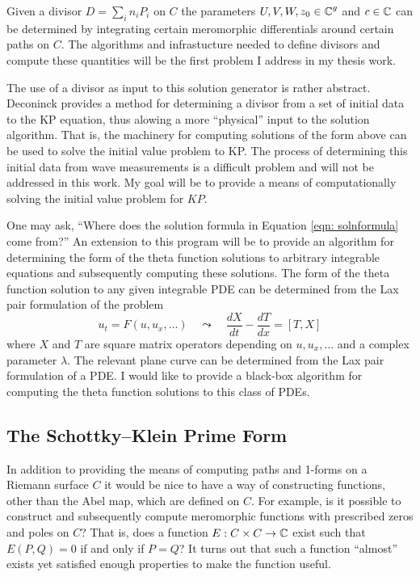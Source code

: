 Given a divisor $D = \sum_i n_i P_i$ on $C$ the parameters $U,V,W,z_0
\in \operatorname{\mathbb{C}}^g$ and $c \in \operatorname{\mathbb{C}}$ can be determined by integrating certain
meromorphic differentials around certain paths on $C$. The algorithms
and infrastucture needed to define divisors and compute these quantities
will be the first problem I address in my thesis work.

The use of a divisor as input to this solution generator is rather
abstract. Deconinck \cite{Deconinck98} provides a method for determining
a divisor from a set of initial data to the KP equation, thus alowing a
more ``physical'' input to the solution algorithm. That is, the
machinery for computing solutions of the form above can be used to solve
the initial value problem to KP. The process of determining this initial
data from wave measurements is a difficult problem and will not be
addressed in this work. My goal will be to provide a means of
computationally solving the initial value problem for $KP$.

One may ask, ``Where does the solution formula in Equation \ref{eqn:
  solnformula} come from?'' An extension to this program will be to
provide an algorithm for determining the form of the theta function
solutions to arbitrary integrable equations and subsequently computing
these solutions. The form of the theta function solution to any given
integrable PDE can be determined from the Lax pair formulation of the
problem
\[
    u_t = F(u,u_x,\ldots)
    \quad \leadsto \quad
    \frac{dX}{dt} - \frac{dT}{dx} = \left[ T,X \right]
\]
where $X$ and $T$ are square matrix operators depending on
$u,u_x,\ldots$ and a complex parameter $\lambda$. The relevant plane
curve can be determined from the Lax pair formulation of a PDE. I would
like to provide a black-box algorithm for computing the theta function
solutions to this class of PDEs.


\subsection{The Schottky--Klein Prime Form}


In addition to providing the means of computing paths and 1-forms on a
Riemann surface $C$ it would be nice to have a way of constructing
functions, other than the Abel map, which are defined on $C$. For
example, is it possible to construct and subsequently compute
meromorphic functions with prescribed zeros and poles on $C$? That is,
does a function $E : C \times C \to \operatorname{\mathbb{C}}$ exist such that $E(P,Q) = 0$ if
and only if $P = Q$? It turns out that such a function ``almost'' exists
yet satisfied enough properties to make the function useful.

